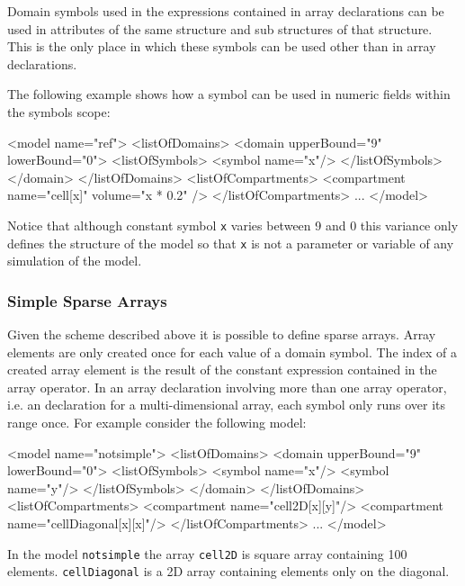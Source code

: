 \documentclass{cekarticle}
\begin{document}
Domain symbols used in the expressions contained in array declarations
can be used in attributes of the same structure and sub
structures of that structure.  This is the only place in which
these symbols can be used other than in array declarations.

The following example shows how a symbol can be used in numeric
fields within the symbols scope:

\begin{example}
<model name="ref">
    <listOfDomains>
        <domain upperBound="9" lowerBound="0">
            <listOfSymbols>
                <symbol name="x"/>
            </listOfSymbols>
        </domain>
    </listOfDomains>
    <listOfCompartments>
        <compartment name="cell[x]" volume="x * 0.2" />
    </listOfCompartments>
    ...
</model>
\end{example}

Notice that although constant symbol \texttt{x} varies between 9
and 0 this variance only defines the structure of the model so
that \texttt{x} is not a parameter or variable of any simulation
of the model.

\subsubsection{Simple Sparse Arrays}

Given the scheme described above it is possible to define sparse
arrays. Array elements are only created once for each value of a
domain symbol. The index of a created array element is the result
of the constant expression contained in the array operator. In an
array declaration involving more than one array operator, i.e. an
declaration for a multi-dimensional array, each symbol only runs
over its range once. For example consider the following model:

\begin{example}
<model name="notsimple">
    <listOfDomains>
        <domain upperBound="9" lowerBound="0">
            <listOfSymbols>
                <symbol name="x"/>
                <symbol name="y"/>
            </listOfSymbols>
        </domain>
    </listOfDomains>
    <listOfCompartments>
        <compartment name="cell2D[x][y]"/>
        <compartment name="cellDiagonal[x][x]"/>
    </listOfCompartments>
    ...
</model>
\end{example}

In the model \texttt{notsimple} the array \texttt{cell2D} is square array
containing 100 elements.  \texttt{cellDiagonal} is a 2D array containing
elements only on the diagonal.
\end{document}
